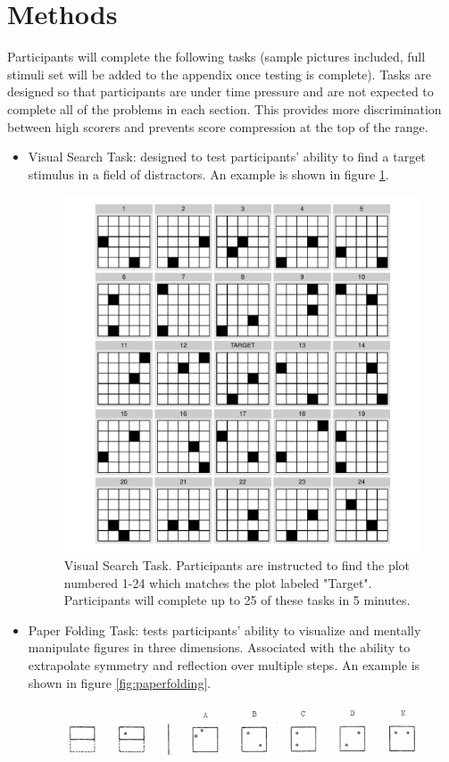 \documentclass[11pt]{isuthesis}\usepackage[]{graphicx}\usepackage[]{color}
\begin{document}
\section{Methods}
Participants will complete the following tasks (sample pictures included, full stimuli set will be added to the appendix once testing is complete). Tasks are designed so that participants are under time pressure and are not expected to complete all of the problems in each section. This provides more discrimination between high scorers and prevents score compression at the top of the range.   
\begin{itemize}
\item Visual Search Task: designed to test participants' ability to find a target stimulus in a field of distractors. An example is shown in figure \ref{fig:VST}. 
\begin{figure}[htbp]\centering
\includegraphics[width=.7\textwidth]{VisualSearch}
\caption[Visual Search Task]{Visual Search Task. Participants are instructed to find the plot numbered 1-24 which matches the plot labeled "Target". Participants will complete up to 25 of these tasks in 5 minutes.}\label{fig:VST}
\end{figure}
\item Paper Folding Task: tests participants' ability to visualize and mentally manipulate figures in three dimensions. Associated with the ability to extrapolate symmetry and reflection over multiple steps. An example is shown in figure \ref{fig:paperfolding}.
\begin{figure}[htbp]\centering
\includegraphics[width=.9\textwidth]{paperfolding}

\end{figure}
\end{itemize}
\end{document}
